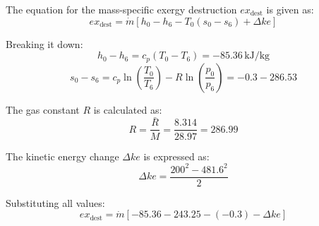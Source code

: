 The equation for the mass-specific exergy destruction \( ex_{\text{dest}} \) is given as:  
\[
ex_{\text{dest}} = \dot{m} \left[ h_0 - h_6 - T_0(s_0 - s_6) + \Delta ke \right]
\]  

Breaking it down:  
\[
h_0 - h_6 = c_p(T_0 - T_6) = -85.36 \, \text{kJ/kg}
\]  
\[
s_0 - s_6 = c_p \ln\left(\frac{T_0}{T_6}\right) - R \ln\left(\frac{p_0}{p_6}\right) = -0.3 - 286.53
\]  

The gas constant \( R \) is calculated as:  
\[
R = \frac{\bar{R}}{M} = \frac{8.314}{28.97} = 286.99
\]  

The kinetic energy change \( \Delta ke \) is expressed as:  
\[
\Delta ke = \frac{200^2 - 481.6^2}{2}
\]  

Substituting all values:  
\[
ex_{\text{dest}} = \dot{m} \left[ -85.36 - 243.25 - (-0.3) - \Delta ke \right]
\]